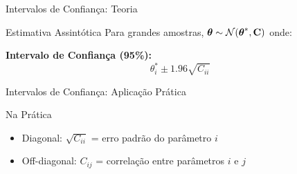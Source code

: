 \begin{frame}{Intervalos de Confiança: Teoria}
\begin{block}{Estimativa Assintótica}
Para grandes amostras, $\boldsymbol{\theta} \sim \mathcal{N}(\boldsymbol{\theta}^*, \mathbf{C})$ onde:
\end{block}


\textbf{Intervalo de Confiança (95\%):}
\begin{equation*}
\theta_i^* \pm 1.96 \sqrt{C_{ii}}
\end{equation*}
\end{frame}

\begin{frame}{Intervalos de Confiança: Aplicação Prática}
\begin{exampleblock}{Na Prática}
\begin{itemize}
    \item Diagonal: $\sqrt{C_{ii}}$ = erro padrão do parâmetro $i$
    \item Off-diagonal: $C_{ij}$ = correlação entre parâmetros $i$ e $j$
\end{itemize}
\end{exampleblock}

\end{frame}

